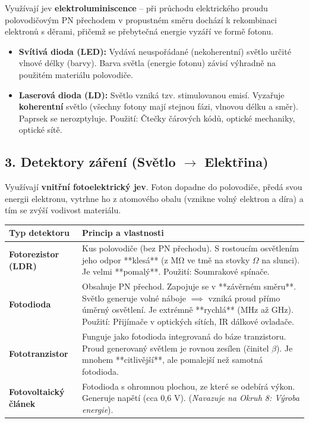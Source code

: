 \documentclass[a4paper,10pt]{article}
\begin{document}
\begin{vysvetlenibox}
Využívají jev \textbf{elektroluminiscence} – při průchodu elektrického proudu polovodičovým PN přechodem v propustném směru dochází k rekombinaci elektronů s děrami, přičemž se přebytečná energie vyzáří ve formě fotonu.

\begin{itemize}
    \item \textbf{Svítivá dioda (LED):} Vydává neuspořádané (nekoherentní) světlo určité vlnové délky (barvy). Barva světla (energie fotonu) závisí výhradně na použitém materiálu polovodiče. 
    \item \textbf{Laserová dioda (LD):} Světlo vzniká tzv. stimulovanou emisí. Vyzařuje \textbf{koherentní} světlo (všechny fotony mají stejnou fázi, vlnovou délku a směr). Paprsek se nerozptyluje. Použití: Čtečky čárových kódů, optické mechaniky, optické sítě.
\end{itemize}

\subsection*{3. Detektory záření (Světlo $\to$ Elektřina)}

Využívají \textbf{vnitřní fotoelektrický jev}. Foton dopadne do polovodiče, předá svou energii elektronu, vytrhne ho z atomového obalu (vznikne volný elektron a díra) a tím se zvýší vodivost materiálu.

\begin{center}
\begin{tabularx}{0.97\linewidth}{@{} l X @{}}
\toprule
\textbf{Typ detektoru} & \textbf{Princip a vlastnosti} \\
\midrule
\textbf{Fotorezistor (LDR)} & Kus polovodiče (bez PN přechodu). S rostoucím osvětlením jeho odpor **klesá** (z $\mathrm{M\Omega}$ ve tmě na stovky $\Omega$ na slunci). Je velmi **pomalý**. Použití: Soumrakové spínače. \\
\textbf{Fotodioda} & Obsahuje PN přechod. Zapojuje se v **závěrném směru**. Světlo generuje volné náboje $\implies$ vzniká proud přímo úměrný osvětlení. Je extrémně **rychlá** (MHz až GHz). Použití: Přijímače v optických sítích, IR dálkové ovladače. \\
\textbf{Fototranzistor} & Funguje jako fotodioda integrovaná do báze tranzistoru. Proud generovaný světlem je rovnou zesílen (činitel $\beta$). Je mnohem **citlivější**, ale pomalejší než samotná fotodioda. \\
\textbf{Fotovoltaický článek} & Fotodioda s ohromnou plochou, ze které se odebírá výkon. Generuje napětí (cca 0,6 V). (\textit{Navazuje na Okruh 8: Výroba energie}). \\
\bottomrule
\end{tabularx}
\end{center}


\end{vysvetlenibox}
\end{document}
